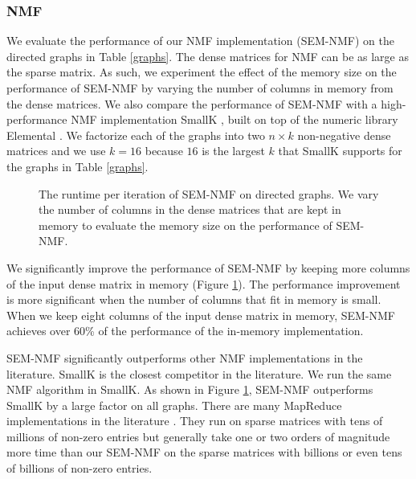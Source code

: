 \subsubsection{NMF}
We evaluate the performance of our NMF implementation (SEM-NMF) on the directed
graphs in Table \ref{graphs}. The dense matrices for NMF can be as large as
the sparse matrix. As such, we experiment the effect of the memory size on
the performance of SEM-NMF by varying the number of columns in memory from
the dense matrices. We also compare the performance of SEM-NMF with
a high-performance NMF implementation SmallK \cite{SmallK}, built on top of
the numeric library Elemental \cite{elemental}. We factorize
each of the graphs into two $n \times k$ non-negative dense matrices and
we use $k=16$ because $16$ is the largest $k$ that SmallK supports for
the graphs in Table \ref{graphs}.

\begin{figure}
	\begin{center}
		\footnotesize
		
		\caption{The runtime per iteration of SEM-NMF on directed graphs.
			We vary the number of columns in the dense matrices that are kept
		in memory to evaluate the memory size on the performance of SEM-NMF.}
		\label{perf:NMF}
	\end{center}
\end{figure}

We significantly improve the performance of SEM-NMF by keeping more columns
of the input dense matrix in memory (Figure \ref{perf:NMF}). The performance
improvement is more significant when the number of columns that fit in memory
is small. When we keep eight columns of the input dense matrix in memory,
SEM-NMF achieves over 60\% of the performance of the in-memory implementation.

SEM-NMF significantly outperforms other NMF implementations in the literature.
SmallK is the closest competitor in the literature. We run the same NMF algorithm
in SmallK. As shown in Figure \ref{perf:NMF}, SEM-NMF outperforms SmallK by
a large factor on all graphs. There are many MapReduce implementations in
the literature \cite{Liao14, Yin14, Liu10}. They run on sparse
matrices with tens of millions of non-zero entries but generally take
one or two orders of magnitude more time than our SEM-NMF on the sparse matrices
with billions or even tens of billions of non-zero entries.

